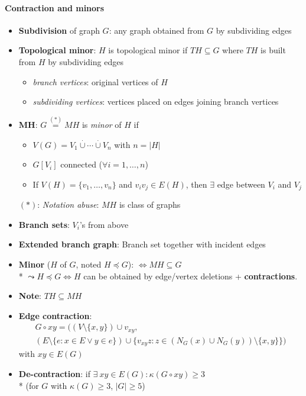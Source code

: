 \paragraph{Contraction and minors}
\begin{itemize}
  \item \textbf{Subdivision} of graph $ G $: any graph obtained from $ G $ by subdividing edges
  \item \textbf{Topological minor}: $ H $ is topological minor if $ TH \subseteq G $ where $ TH $ is built from $ H $ by subdividing edges
  \begin{itemize}
    \item \emph{branch vertices}: original vertices of $ H $
    \item \emph{subdividing vertices}: vertices placed on edges joining branch vertices
  \end{itemize}
  \item \textbf{MH}: $ G \overset{(\ast)}{=} MH $ is \emph{minor} of $ H $ if
  \begin{itemize}
    \item $ V(G) = V_1 \overset{\cdot}{\cup} \cdots \overset{\cdot}{\cup} V_n $ with $ n = \vert H \vert $
    \item $ G[V_i] $ connected ($ \forall i = 1, \dots, n $)
    \item If $ V(H) = \{ v_1, \dots, v_n \} $ and $ v_iv_j \in E(H) $, then $ \exists $ edge between $ V_i $ and $ V_j $
  \end{itemize}
  $ (\ast) $: \emph{Notation abuse}: $ MH $ is class of graphs
  \item \textbf{Branch sets}: $ V_i $'s from above
  \item \textbf{Extended branch graph}: Branch set together with incident edges
  \item \textbf{Minor} ($ H $ of $ G $, noted $ H \preccurlyeq G $): $ \Leftrightarrow MH \subseteq G $ \\*
    $ \leadsto H \preccurlyeq G \Leftrightarrow H $ can be obtained by edge/vertex deletions + \textbf{contractions}.
  \item \textbf{Note}: $ TH \subseteq MH $
  \item \textbf{Edge contraction}:
  \begin{multline*}
    G \circ xy = ((V \setminus \{ x,y \}) \cup v_{xy}, \\
      (E \setminus \{ e: x \in E \vee y \in e \}) \cup \{ v_{xy}z : z \in (N_G(x) \cup N_G(y))\setminus \{ x,y \} \})
  \end{multline*}
  with $ xy \in E(G) $
  \item \textbf{De-contraction}: if $ \exists \ xy \in E(G) : \kappa(G \circ xy) \geq 3 $ \\*
    (for $ G $ with $ \kappa(G) \geq 3 $, $ \vert G \vert \geq 5 $) 
\end{itemize}

